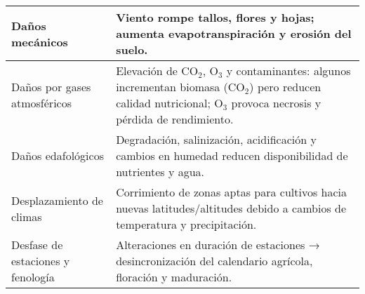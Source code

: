 \begin{table}[ht]
\begin{tabularx}{\textwidth}{|l|X|}
		Daños mecánicos & Viento rompe tallos, flores y hojas; aumenta evapotranspiración y erosión del suelo. \\ \hline
		Daños por gases atmosféricos & Elevación de CO$_2$, O$_3$ y contaminantes: algunos incrementan biomasa (CO$_2$) pero reducen calidad nutricional; O$_3$ provoca necrosis y pérdida de rendimiento. \\ \hline
		Daños edafológicos & Degradación, salinización, acidificación y cambios en humedad reducen disponibilidad de nutrientes y agua. \\ \hline
		Desplazamiento de climas & Corrimiento de zonas aptas para cultivos hacia nuevas latitudes/altitudes debido a cambios de temperatura y precipitación. \\ \hline
		Desfase de estaciones y fenología & Alteraciones en duración de estaciones → desincronización del calendario agrícola, floración y maduración. \\ \hline
	\end{tabularx}
\end{table}

